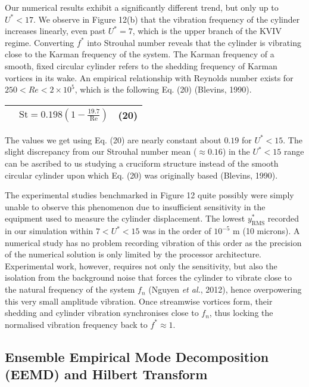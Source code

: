 \documentclass[]{article}
\begin{document}
Our numerical results exhibit a significantly different trend, but only
up to \(U^{*} < 17\). We observe in Figure 12(b) that the vibration
frequency of the cylinder increases linearly, even past \(U^{*} = 7\),
which is the upper branch of the KVIV regime. Converting \(f^{*}\) into
Strouhal number reveals that the cylinder is vibrating close to the
Karman frequency of the system. The Karman frequency of a smooth, fixed
circular cylinder refers to the shedding frequency of Karman vortices in
its wake. An empirical relationship with Reynolds number exists for
\(250 < Re < 2 \times 10^{5}\), which is the following Eq. (20)
(Blevins, 1990).

\begin{longtable}[]{@{}lll@{}}
\toprule
& \(\text{St} = 0.198\left( 1 - \frac{19.7}{\text{Re}} \right)\) &
\protect\hypertarget{_Ref41045031}{}{}(20)\tabularnewline
\midrule
\endhead
\bottomrule
\end{longtable}

The values we get using Eq. (20) are nearly constant about \(0.19\) for
\(U^{*} < 15\). The slight discrepancy from our Strouhal number mean
(\(\approx 0.16\)) in the \(U^{*} < 15\) range can be ascribed to us
studying a cruciform structure instead of the smooth circular cylinder
upon which Eq. (20) was originally based (Blevins, 1990).

The experimental studies benchmarked in Figure 12 quite possibly were
simply unable to observe this phenomenon due to insufficient sensitivity
in the equipment used to measure the cylinder displacement. The lowest
\(y_{\text{RMS}}^{*}\) recorded in our simulation within
\(7 < U^{*} < 15\) was in the order of \(10^{- 5}\) m (10 microns). A
numerical study has no problem recording vibration of this order as the
precision of the numerical solution is only limited by the processor
architecture. Experimental work, however, requires not only the
sensitivity, but also the isolation from the background noise that
forces the cylinder to vibrate close to the natural frequency of the
system \(f_{n}\) (Nguyen \emph{et al.}, 2012), hence overpowering this
very small amplitude vibration. Once streamwise vortices form, their
shedding and cylinder vibration synchronises close to \(f_{n}\), thus
locking the normalised vibration frequency back to \(f^{*} \approx 1\).

\hypertarget{ensemble-empirical-mode-decomposition-eemd-and-hilbert-transform}{\subsection{Ensemble
Empirical Mode Decomposition (EEMD) and Hilbert
Transform}\label{ensemble-empirical-mode-decomposition-eemd-and-hilbert-transform}}
\end{document}
